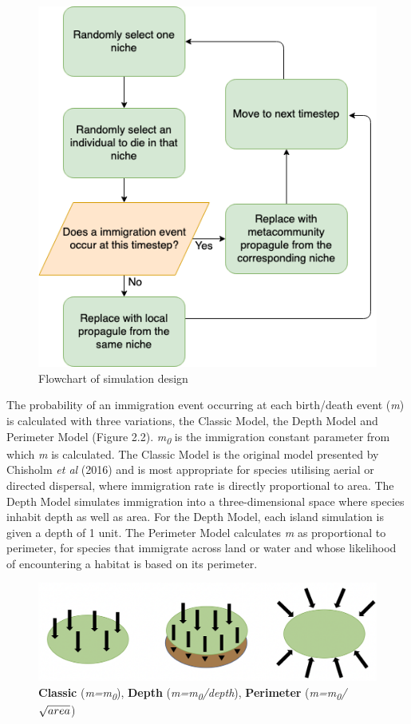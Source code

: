  \begin{figure}[h!]
\centering
  \includegraphics[scale=0.5]{SimFlow.png}
  \caption{Flowchart of simulation design}
  \label{fig:Flowchart}
\end{figure}

\noindent The probability of an immigration event occurring at each birth/death event (\textit{m}) is calculated with three variations, the Classic Model, the Depth Model and Perimeter Model (Figure 2.2). \textit{m\textsubscript{0}} is the immigration constant parameter from which \textit{m} is calculated. The Classic Model is the original model presented by Chisholm \textit{et al} (2016) and is most appropriate for species utilising aerial or directed dispersal, where immigration rate is directly proportional to area. The Depth Model simulates immigration into a three-dimensional space where species inhabit depth as well as area. For the Depth Model, each island simulation is given a depth of 1 unit. The Perimeter Model calculates \textit{m} as proportional to perimeter, for species that immigrate across land or water and whose likelihood of encountering a habitat is based on its perimeter. \\


 \begin{figure}[h!]
\centering
  \includegraphics[scale=0.5]{models.png}
  \caption{\textbf{Classic} (\textit{m=m\textsubscript{0}}), \textbf{Depth} (\textit{m=m\textsubscript{0}/depth}), \textbf{Perimeter} (\textit{m=m\textsubscript{0}/$\protect\sqrt{area}$}) }
  \label{fig:Models}
\end{figure}

